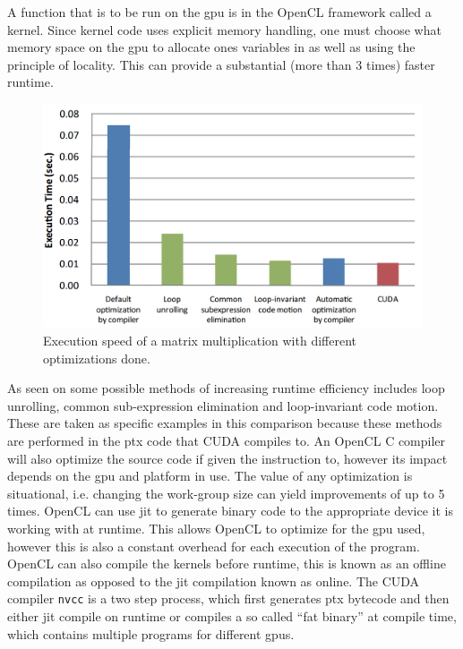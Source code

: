 A function that is to be run on the \acrshort{gpu} is in the OpenCL framework called a kernel.
Since kernel code uses explicit memory handling, one must choose what memory space on the \acrshort{gpu} to allocate ones variables in as well as using the principle of locality.
This can provide a substantial (more than 3 times) faster runtime. \citep{ocl_lecture3}
\begin{figure}[h]
\centering	
 \includegraphics[width=1\textwidth]{figures/opencloptimisation.png} %
\caption{Execution speed of a matrix multiplication with different optimizations done. \citep{CUDAOpenCLOptimisation}}\label{image:OpenCLOptCompare}
\vspace{-15pt}
\end{figure}
As seen on  some possible methods of increasing runtime efficiency includes loop unrolling, common sub-expression elimination and loop-invariant code motion. 
These are taken as specific examples in this comparison because these methods are performed in the \acrfull{ptx} code that CUDA compiles to. %
An OpenCL C compiler will also optimize the source code if given the instruction to, however its impact depends on the \acrshort{gpu} and platform in use.
The value of any optimization is situational, i.e. changing the work-group size can yield improvements of up to 5 times. \citep{ocl_lecture3}
OpenCL can use \acrshort{jit} to generate binary code to the appropriate device it is working with at runtime.
This allows OpenCL to optimize for the \acrshort{gpu} used, however this is also a constant overhead for each execution of the program. 
OpenCL can also compile the kernels before runtime, this is known as an offline compilation as opposed to the \acrshort{jit} compilation known as online. 
The CUDA compiler \texttt{nvcc} is a two step process, which first generates \acrshort{ptx} bytecode and then either \acrshort{jit} compile on runtime or compiles a so called ``fat binary'' at compile time, which contains multiple programs for different \acrshort{gpu}s. \citep{nvidia_cude_fat_bin}

